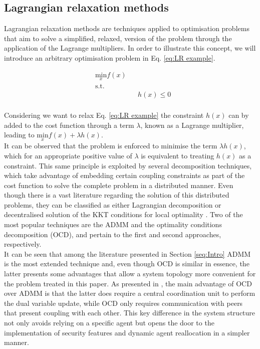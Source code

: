 \documentclass[a4paper,fleqn]{cas-sc}
\begin{document}

\subsection{Lagrangian relaxation methods }
Lagrangian relaxation methods are techniques applied to optimisation problems that aim to solve a simplified, relaxed, version of the problem through the application of the Lagrange multipliers. In order to illustrate this concept, we will introduce an arbitrary optimisation problem in Eq. \eqref{eq:LR example}. 

\begin{equation}
\label{eq:LR example}
\begin{aligned}
    & \underset{x}{\text{min}}f(x) \\
    & \text{s.t.}\\
    &&& h(x) \leq 0 \\
\end{aligned}
\end{equation}

Considering we want to relax Eq. \eqref{eq:LR example} the constraint $h(x)$ can by added to the cost function through a term $\lambda$, known as a Lagrange multiplier, leading to $\underset{x}{\text{min}}f(x) + \lambda h(x)$.\\ 

It can be observed that the problem is enforced to minimise the term $\lambda h(x)$, which for an appropriate positive value of $\lambda$ is equivalent to treating $h(x)$ as a constraint. This same principle is exploited by several decomposition techniques, which take advantage of embedding certain coupling constraints as part of the cost function to solve the complete problem in a distributed manner. Even though there is a vast literature regarding the solution of this distributed problems, they can be classified as either Lagrangian decomposition or decentralised solution of the KKT conditions for local optimality \cite{kargarian2016toward}. Two of the most popular techniques are the ADMM and the optimality conditions decomposition
(OCD), and pertain to the first and second approaches, respectively. \\ 

It can be seen that among the literature presented in Section \ref{seq:Intro} ADMM is the most extended technique and, even though OCD is similar in essence, the latter presents some advantages that allow a system topology more convenient for the problem treated in this paper. As presented in \cite{Segovia2021}, the main advantage of OCD over ADMM is that the latter does require a central coordination unit to perform the dual variable update, while OCD only requires communication with peers that present coupling with each other. This key difference in the system structure not only avoids relying on a specific agent but opens the door to the implementation of security features and dynamic agent reallocation in a simpler manner. \\
\end{document}
